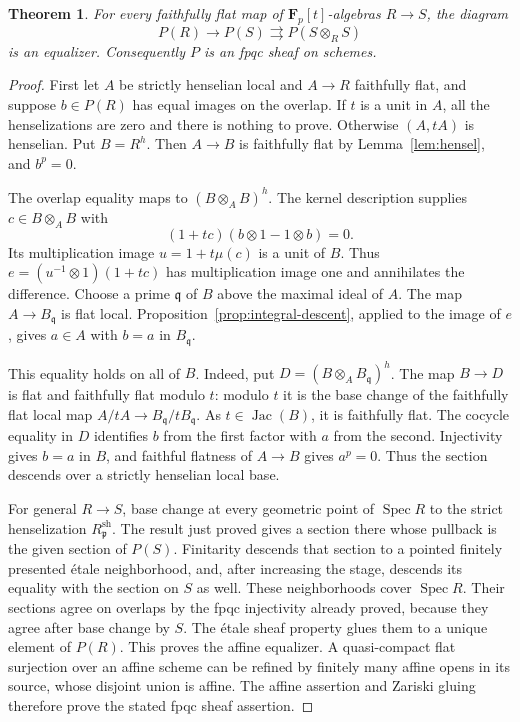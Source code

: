 \documentclass[11pt]{article}
\newtheorem{theorem}{Theorem}[section]
\theoremstyle{definition}\newtheorem{definition}[theorem]{Definition}
\theoremstyle{remark}\newtheorem{remark}[theorem]{Remark}
\newcommand{\F}{\mathbf F}
\newcommand{\Spec}{\operatorname{Spec}}
\newcommand{\Jac}{\operatorname{Jac}}
\begin{document}
\begin{theorem}\label{thm:fpqc}
For every faithfully flat map of $\F_p[t]$-algebras $R\to S$, the diagram
\[
 P(R)\longrightarrow P(S)\rightrightarrows P(S\otimes_R S)
\]
is an equalizer. Consequently $P$ is an fpqc sheaf on schemes.
\end{theorem}
\begin{proof}
First let $A$ be strictly henselian local and $A\to R$ faithfully flat, and suppose $b\in P(R)$ has equal images on the overlap. If $t$ is a unit in $A$, all the henselizations are zero and there is nothing to prove. Otherwise $(A,tA)$ is henselian. Put $B=R^h$. Then $A\to B$ is faithfully flat by Lemma~\ref{lem:hensel}, and $b^p=0$.

The overlap equality maps to $(B\otimes_A B)^h$. The kernel description supplies $c\in B\otimes_A B$ with
\[
 (1+tc)(b\otimes1-1\otimes b)=0.
\]
Its multiplication image $u=1+t\mu(c)$ is a unit of $B$. Thus $e=(u^{-1}\otimes1)(1+tc)$ has multiplication image one and annihilates the difference. Choose a prime $\mathfrak q$ of $B$ above the maximal ideal of $A$. The map $A\to B_{\mathfrak q}$ is flat local. Proposition~\ref{prop:integral-descent}, applied to the image of $e$, gives $a\in A$ with $b=a$ in $B_{\mathfrak q}$.

This equality holds on all of $B$. Indeed, put $D=(B\otimes_A B_{\mathfrak q})^h$. The map $B\to D$ is flat and faithfully flat modulo $t$: modulo $t$ it is the base change of the faithfully flat local map $A/tA\to B_{\mathfrak q}/tB_{\mathfrak q}$. As $t\in\Jac(B)$, it is faithfully flat. The cocycle equality in $D$ identifies $b$ from the first factor with $a$ from the second. Injectivity gives $b=a$ in $B$, and faithful flatness of $A\to B$ gives $a^p=0$. Thus the section descends over a strictly henselian local base.

For general $R\to S$, base change at every geometric point of $\Spec R$ to the strict henselization $R_{\mathfrak p}^{\mathrm{sh}}$. The result just proved gives a section there whose pullback is the given section of $P(S)$. Finitarity descends that section to a pointed finitely presented \'etale neighborhood, and, after increasing the stage, descends its equality with the section on $S$ as well. These neighborhoods cover $\Spec R$. Their sections agree on overlaps by the fpqc injectivity already proved, because they agree after base change by $S$. The \'etale sheaf property glues them to a unique element of $P(R)$. This proves the affine equalizer. A quasi-compact flat surjection over an affine scheme can be refined by finitely many affine opens in its source, whose disjoint union is affine. The affine assertion and Zariski gluing therefore prove the stated fpqc sheaf assertion.
\end{proof}
\end{document}
